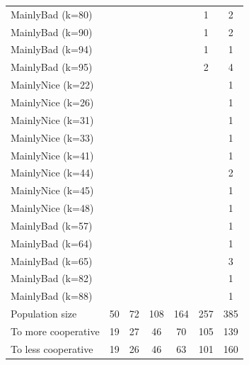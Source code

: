 \documentclass[journal,10pt,twoside]{IEEEtran}
\begin{document}
\begin{table}[ht]
\begin{minipage}{.4\textwidth}
\begin{tabular}{l|cccccc}
        MainlyBad (k=80)     &     &     &      &      &    1 &    2 \\
        MainlyBad (k=90)     &     &     &      &      &    1 &    2 \\
        MainlyBad (k=94)     &     &     &      &      &    1 &    1 \\
        MainlyBad (k=95)     &     &     &      &      &    2 &    4 \\
        MainlyNice (k=22)    &     &     &      &      &      &    1 \\
        MainlyNice (k=26)    &     &     &      &      &      &    1 \\
        MainlyNice (k=31)    &     &     &      &      &      &    1 \\
        MainlyNice (k=33)    &     &     &      &      &      &    1 \\
        MainlyNice (k=41)    &     &     &      &      &      &    1 \\
        MainlyNice (k=44)    &     &     &      &      &      &    2 \\
        MainlyNice (k=45)    &     &     &      &      &      &    1 \\
        MainlyNice (k=48)    &     &     &      &      &      &    1 \\
        MainlyBad (k=57)     &     &     &      &      &      &    1 \\
        MainlyBad (k=64)     &     &     &      &      &      &    1 \\
        MainlyBad (k=65)     &     &     &      &      &      &    3 \\
        MainlyBad (k=82)     &     &     &      &      &      &    1 \\
        MainlyBad (k=88)     &     &     &      &      &      &    1 \\ \midrule
        Population size      &  50 &  72 &  108 &  164 &  257 &  385 \\
        To more cooperative  &  19 &  27 &   46 &   70 &  105 &  139 \\
        To less cooperative  &  19 &  26 &   46 &   63 &  101 &  160 \\ \bottomrule
    \end{tabular}
    \end{minipage}
\end{table}
\end{document}
